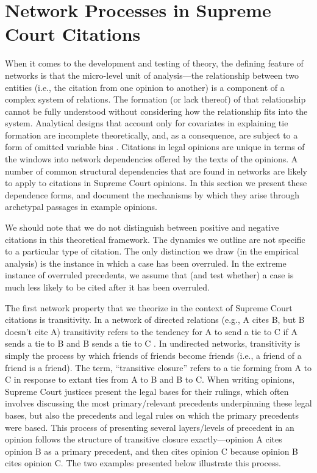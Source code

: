 \documentclass{cup-pan}
\begin{document}
\section{Network Processes in Supreme Court Citations} 

When it comes to the development and testing of theory, the defining feature of networks is that the micro-level unit of analysis---the relationship between two entities (i.e., the citation from one opinion to another) is a component of a complex system of relations. The formation (or lack thereof) of that relationship cannot be fully understood without considering how the relationship fits into the system. Analytical designs that account only for covariates in explaining tie formation are incomplete theoretically, and, as a consequence, are subject to a form of omitted variable bias \citep{cranmer2016critique}. Citations in legal opinions are unique in terms of the windows into network dependencies offered by the texts of the opinions. A number of common structural dependencies that are found in networks are likely to apply to citations in Supreme Court opinions. In this section we present these dependence forms, and document the mechanisms by which they arise through archetypal passages in example opinions. 

We should note that we do not distinguish between positive and negative citations in this theoretical framework. The dynamics we outline are not specific to a particular type of citation. The only distinction we draw (in the empirical analysis) is the instance in which a case has been overruled. In the extreme instance of overruled precedents, we assume that (and test whether) a case is much less likely to be cited after it has been overruled.

The first network property that we theorize in the context of Supreme Court citations is transitivity. In a network of directed relations (e.g., A cites B, but B doesn't cite A) transitivity refers to the tendency for A to send a tie to C if A sends a tie to B and B sends a tie to C \citep{holland1971transitivity}. In undirected networks, transitivity is simply the process by which friends of friends become friends (i.e., a friend of a friend is a friend). The term, ``transitive closure'' refers to a tie forming from A to C in response to extant ties from A to B and B to C. When writing opinions, Supreme Court justices present the legal bases for their rulings, which often involves discussing the most primary/relevant precedents underpinning these legal bases, but also the precedents and legal rules on which the primary precedents were based. This process of presenting several layers/levels of precedent in an opinion follows the structure of transitive closure exactly---opinion A cites opinion B as a primary precedent, and then cites opinion C because opinion B cites opinion C. The two examples presented below illustrate this process.
\end{document}
